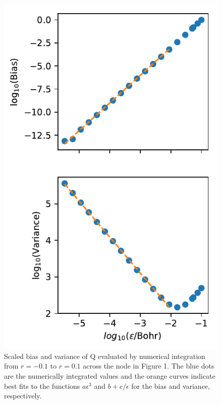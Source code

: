 \documentclass{article}
\begin{document}
\begin{figure}
\centering
\includegraphics{../2_plots/integratenode.pdf}
\caption{Scaled bias and variance of Q evaluated by numerical integration from $r = -0.1$ to $r = 0.1$ across the node in Figure 1. The blue dots are the numerically integrated values and the orange curves indicate best fits to the functions $a\epsilon^3$ and $b + c/\epsilon$ for the bias and variance, respectively.}
\end{figure}
\end{document}
